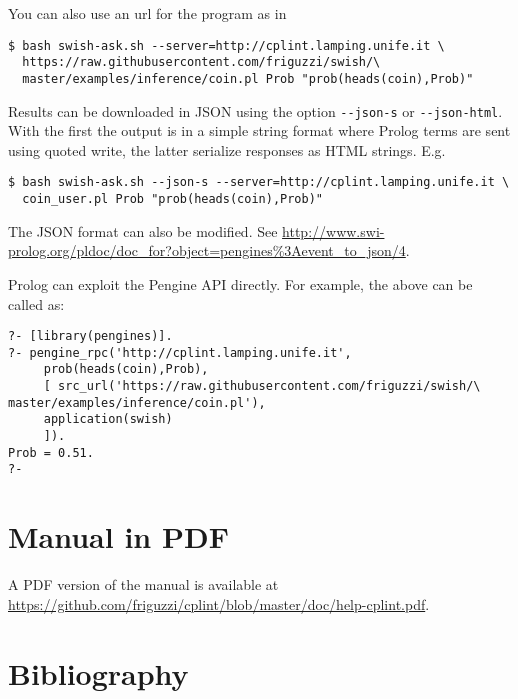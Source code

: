 \documentclass[a4paper,10pt]{scrartcl}
\begin{document}
You can also use an url for the program as in 
\begin{verbatim}
$ bash swish-ask.sh --server=http://cplint.lamping.unife.it \
  https://raw.githubusercontent.com/friguzzi/swish/\  
  master/examples/inference/coin.pl Prob "prob(heads(coin),Prob)"
\end{verbatim}
Results can be downloaded in JSON using the option \verb|--json-s| or
\verb|--json-html|.
With the first the output is in a simple string format where Prolog terms are sent using quoted write, the latter serialize responses as HTML strings. E.g.
\begin{verbatim}
$ bash swish-ask.sh --json-s --server=http://cplint.lamping.unife.it \
  coin_user.pl Prob "prob(heads(coin),Prob)"
\end{verbatim}
The JSON format can also be modified. See
\url{http://www.swi-prolog.org/pldoc/doc_for?object=pengines%3Aevent_to_json/4}.

Prolog can exploit the Pengine API directly.  For example, the above can
be called as:
\begin{verbatim}
?- [library(pengines)].
?- pengine_rpc('http://cplint.lamping.unife.it',
     prob(heads(coin),Prob),
     [ src_url('https://raw.githubusercontent.com/friguzzi/swish/\  
master/examples/inference/coin.pl'),
     application(swish)
     ]).
Prob = 0.51.
?-
\end{verbatim}

\section{Manual in PDF}
A PDF version of the manual is available at
\url{https://github.com/friguzzi/cplint/blob/master/doc/help-cplint.pdf}.
\section{Bibliography}


\end{document}
